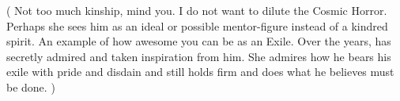 (%
  Not too much kinship, mind you. 
  I do not want to dilute the Cosmic Horror.
  Perhaps she sees him as an ideal or possible mentor-figure instead of a kindred spirit.
  An example of how awesome you can be as an Exile.
  Over the years, \Achsah has secretly admired \Ishnaruchaefir and taken inspiration from him.
  She admires how he bears his exile with pride and disdain and still holds firm and does what he believes must be done.%
)

\begin{prose}
\end{prose}









